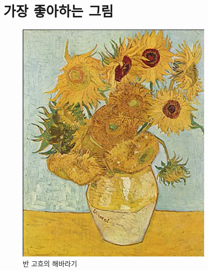 \documentclass{article}
\begin{document}
\section{가장 좋아하는 그림}
\begin{figure}[!htb]
    \centering
    \includegraphics[width=0.5\linewidth]{image1.png}
    \caption{반 고흐의 해바라기}
    \label{fig-1}
\end{figure}
\end{document}
